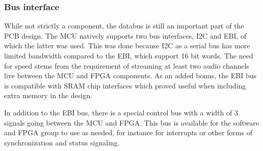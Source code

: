 
\subsubsection{Bus interface}

While not strictly a component, the databus is still an important part of the
PCB design. The MCU natively supports two bus interfaces, I2C and EBI, of which
the latter was used. This was done because I2C as a serial bus has more limited
bandwidth compared to the EBI, which support 16 bit words. The need for speed
stems from the requirement of streaming at least two audio channels live between
the MCU and FPGA components. As an added bonus, the EBI bus is compatible with
SRAM chip interfaces which proved useful when including extra memory in the
design.

In addition to the EBI bus, there is a special control bus with a width of 3
signals going between the MCU and FPGA. This bus is available for the software
and FPGA group to use as needed, for instance for interrupts or other forms of
synchronization and status signaling.
